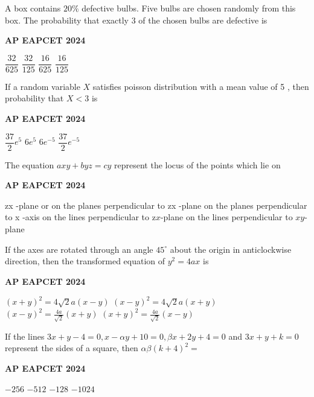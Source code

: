 \documentclass[11pt,paper=a4,answers]{exam}
\begin{document}
\begin{multicols}{2}
\begin{questions}
\question
A box contains $20 \%$ defective bulbs. Five bulbs are chosen randomly from this box. The probability that exactly 3 of the chosen bulbs are defective is
\begin{flushright}
\small\textbf{AP EAPCET 2024}
\end{flushright}
\begin{choices}
  \choice $\dfrac{32}{625}$
  \choice $\dfrac{32}{125}$
  \choice $\dfrac{16}{625}$
  \choice $\dfrac{16}{125}$
\end{choices}


\question
If a random variable $X$ satisfies poisson distribution with a mean value of 5 , then probability that $X<3$ is
\begin{flushright}
\small\textbf{AP EAPCET 2024}
\end{flushright}
\begin{choices}
  \choice $\dfrac{37}{2} e^5$
  \choice $6 e^5$ 
  \choice $6 e^{-5}$ 
  \choice $\dfrac{37}{2} e^{-5}$
\end{choices}


\question
The equation $a x y+b y z=c y$ represent the locus of the points which lie on
\begin{flushright}
\small\textbf{AP EAPCET 2024}
\end{flushright}
\begin{choices}
  \choice zx -plane or on the planes perpendicular to zx -plane
  \choice on the planes perpendicular to x -axis
  \choice on the lines perpendicular to $\mathrm{z} x$-plane
  \choice on the lines perpendicular to $x y$-plane
\end{choices}

\question
If the axes are rotated through an angle $45^{\circ}$ about the origin in anticlockwise direction, then the transformed equation of $y^2=4 a x$ is
\begin{flushright}
\small\textbf{AP EAPCET 2024}
\end{flushright}
\begin{choices}
  \choice $(x+y)^2=4 \sqrt{2} a(x-y)$
  \choice $(x-y)^2=4 \sqrt{2} a(x+y)$
  \choice $(x-y)^2=\frac{4 a}{\sqrt{2}}(x+y)$
  \choice $(x+y)^2=\frac{4 a}{\sqrt{2}}(x-y)$
\end{choices}

\question
If the lines $3 x+y-4=0, x-\alpha y+10=0, \beta x+2 y+4=0$ and $3 x+y+k=0$ represent the sides of a square, then $\alpha \beta(k+4)^2=$
\begin{flushright}
\small\textbf{AP EAPCET 2024}
\end{flushright}
\begin{choices}
  \choice $-256$
  \choice $-512$ 
  \choice $-128$ 
  \choice $-1024$
\end{choices}


\end{questions}
\end{multicols}
\end{document}
